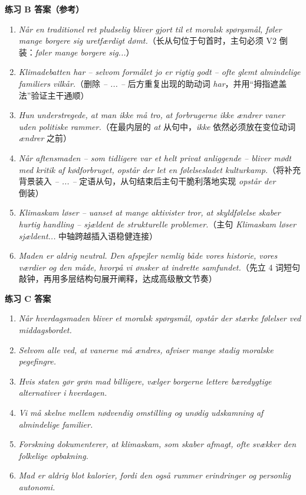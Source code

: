 \begin{answerbox}
\textbf{练习 B 答案（参考）}
\begin{enumerate}
  \item \textit{Når en traditionel ret pludselig bliver gjort til et moralsk spørgsmål, føler mange borgere sig uretfærdigt dømt.}（长从句位于句首时，主句必须 V2 倒装：\textit{føler mange borgere sig...}）
  \item \textit{Klimadebatten har -- selvom formålet jo er rigtig godt -- ofte glemt almindelige familiers vilkår.}（删除 \textit{-- ... --} 后方重复出现的助动词 \textit{har}，并用“拇指遮盖法”验证主干通顺）
  \item \textit{Hun understregede, at man ikke må tro, at forbrugerne ikke ændrer vaner uden politiske rammer.}（在最内层的 \textit{at} 从句中，\textit{ikke} 依然必须放在变位动词 \textit{ændrer} 之前）
  \item \textit{Når aftensmaden -- som tidligere var et helt privat anliggende -- bliver mødt med kritik af kødforbruget, opstår der let en følelsesladet kulturkamp.}（将补充背景装入 \textit{-- ... --} 定语从句，从句结束后主句干脆利落地实现 \textit{opstår der} 倒装）
  \item \textit{Klimaskam løser -- uanset at mange aktivister tror, at skyldfølelse skaber hurtig handling -- sjældent de strukturelle problemer.}（主句 \textit{Klimaskam løser sjældent...} 中轴跨越插入语稳健连接）
  \item \textit{Maden er aldrig neutral. Den afspejler nemlig både vores historie, vores værdier og den måde, hvorpå vi ønsker at indrette samfundet.}（先立 4 词短句敲钟，再用多层结构句展开阐释，达成高级散文节奏）
\end{enumerate}

\textbf{练习 C 答案}
\begin{enumerate}
  \item \textit{Når hverdagsmaden bliver et moralsk spørgsmål, opstår der stærke følelser ved middagsbordet.}
  \item \textit{Selvom alle ved, at vanerne må ændres, afviser mange stadig moralske pegefingre.}
  \item \textit{Hvis staten gør grøn mad billigere, vælger borgerne lettere bæredygtige alternativer i hverdagen.}
  \item \textit{Vi må skelne mellem nødvendig omstilling og unødig udskamning af almindelige familier.}
  \item \textit{Forskning dokumenterer, at klimaskam, som skaber afmagt, ofte svækker den folkelige opbakning.}
  \item \textit{Mad er aldrig blot kalorier, fordi den også rummer erindringer og personlig autonomi.}
\end{enumerate}


\end{answerbox}
